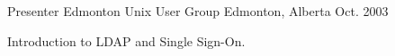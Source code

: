 \begin{cventries}
  \cventry
    {Presenter} %
    {Edmonton Unix User Group} %
    {Edmonton, Alberta} %
    {Oct. 2003} %
    {
      \begin{cvitems} %
        \item {Introduction to LDAP and Single Sign-On.}
      \end{cvitems}
    }

\end{cventries}
